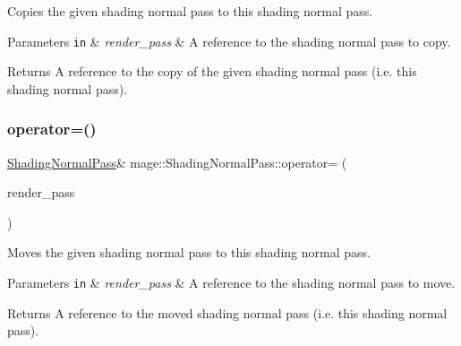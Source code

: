 Copies the given shading normal pass to this shading normal pass.


\begin{DoxyParams}[1]{Parameters}
\mbox{\tt in}  & {\em render\+\_\+pass} & A reference to the shading normal pass to copy. \\
\hline
\end{DoxyParams}
\begin{DoxyReturn}{Returns}
A reference to the copy of the given shading normal pass (i.\+e. this shading normal pass). 
\end{DoxyReturn}
\hypertarget{classmage_1_1_shading_normal_pass_a25a9ba6a32a246176929f4de1a4adf0c}{}\label{classmage_1_1_shading_normal_pass_a25a9ba6a32a246176929f4de1a4adf0c} 
\subsubsection{\texorpdfstring{operator=()}{operator=()}\hspace{0.1cm}{\footnotesize\ttfamily [2/2]}}
{\footnotesize\ttfamily \hyperlink{classmage_1_1_shading_normal_pass}{Shading\+Normal\+Pass}\& mage\+::\+Shading\+Normal\+Pass\+::operator= (\begin{DoxyParamCaption}\item[{\hyperlink{classmage_1_1_shading_normal_pass}{Shading\+Normal\+Pass} \&\&}]{render\+\_\+pass }\end{DoxyParamCaption})\hspace{0.3cm}{\ttfamily [delete]}}

Moves the given shading normal pass to this shading normal pass.


\begin{DoxyParams}[1]{Parameters}
\mbox{\tt in}  & {\em render\+\_\+pass} & A reference to the shading normal pass to move. \\
\hline
\end{DoxyParams}
\begin{DoxyReturn}{Returns}
A reference to the moved shading normal pass (i.\+e. this shading normal pass). 
\end{DoxyReturn}
\hypertarget{classmage_1_1_shading_normal_pass_a383e9cab46d4d9bdfcf320c68a210d0d}{}\label{classmage_1_1_shading_normal_pass_a383e9cab46d4d9bdfcf320c68a210d0d} 
